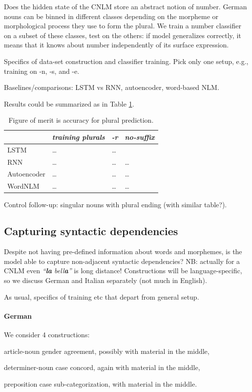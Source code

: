 Does the hidden state of the CNLM store an abstract notion of
number. German nouns can be binned in different classes depending on
the morpheme or morphological process they use to form the plural. We
train a number classifier on a subset of these classes, test on the
others: if model generalizes correctly, it means that it knows about
number independently of its surface expression.

Specifics of data-set construction and classifier training. Pick only one setup, e.g., training on -n, -s, and -e.

Baselines/comparisons: LSTM vs RNN, autoencoder, word-based NLM.

Results could be summarized as in Table \ref{tab:number-results}.


\begin{table}[t]
  \begin{center}
    \begin{tabular}{l|l|l|l}
      \multicolumn{1}{c}{}&\emph{training plurals}&\emph{-r}&\emph{no-suffix}\\
      \hline
      LSTM&\ldots&\ldots\\
      RNN&\ldots&\ldots&\ldots\\
      Autoencoder&\ldots&\ldots&\ldots\\
      WordNLM&\ldots&\ldots&\ldots\\
    \end{tabular}
  \end{center}
  \caption{\label{tab:number-results} Figure of merit is accuracy for plural prediction.}
\end{table}


Control follow-up: singular nouns with plural ending (with similar table?).

\subsection{Capturing syntactic dependencies}
\label{sec:dependencies}

Despite not having pre-defined information about words and morphemes,
is the model able to capture non-adjacent syntactic dependencies? NB:
actually for a CNLM even \emph{``\textbf{la} bell\textbf{a}''} is long
distance! Constructions will be language-specific, so we discuss
German and Italian separately (not much in English).

As usual, specifics of training etc that depart from general setup.

\paragraph{German} We consider 4 constructions:
\begin{inparaenum}[i)]
\item article-noun gender agreement, possibly with material in the middle,
\item determiner-noun case concord, again with material in the middle,
\item preposition case sub-categorization, with material in the middle.
\end{inparaenum}


